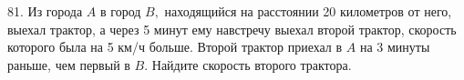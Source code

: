 81. Из города $A$ в город $B,$ находящийся на расстоянии 20 километров от него, выехал трактор,
а через 5 минут ему навстречу выехал второй трактор, скорость которого была на 5 км/ч больше. Второй трактор приехал в $A$
на 3 минуты раньше, чем первый в $B.$ Найдите скорость второго трактора.\\
